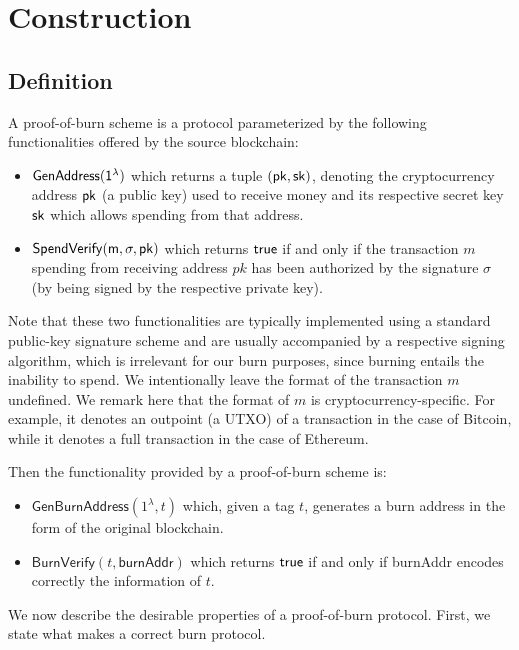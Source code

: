 \section{Construction}

\subsection{Definition}
A proof-of-burn scheme is a protocol parameterized by the following functionalities offered by the source blockchain:

\begin{itemize}
  \item $\sf{GenAddress}(1^\lambda)$ which returns a tuple $(\sf{pk}, \sf{sk})$, denoting the cryptocurrency address $\sf{pk}$ (a public key) used to receive money and its respective secret key $\sf{sk}$ which allows spending from that address.

  \item $\sf{SpendVerify}(m, \sigma, pk)$ which returns $\sf{true}$ if and only if the transaction $m$ spending from receiving address $pk$ has been authorized by the signature $\sigma$ (by being signed by the respective private key).
\end{itemize}

Note that these two functionalities are typically implemented using a standard public-key signature scheme and are usually accompanied by a respective signing algorithm, which is irrelevant for our burn purposes, since burning entails the inability to spend. We intentionally leave the format of the transaction $m$ undefined. We remark here that the format of $m$ is cryptocurrency-specific. For example, it denotes an outpoint (a UTXO) of a transaction in the case of Bitcoin, while it denotes a full transaction in the case of Ethereum.

Then the functionality provided by a proof-of-burn scheme is:

\begin{itemize}
  \item $\mathsf{GenBurnAddress}(1^\lambda, t)$ which, given a tag $t$, generates a burn address in the form of the original blockchain.

  \item $\mathsf{BurnVerify}(t, \mathsf{burnAddr})$ which returns $\sf{true}$ if and only if \textsf{burnAddr} encodes correctly the information of $t$.
\end{itemize}

We now describe the desirable properties of a proof-of-burn protocol. First, we state what makes a correct burn protocol.

